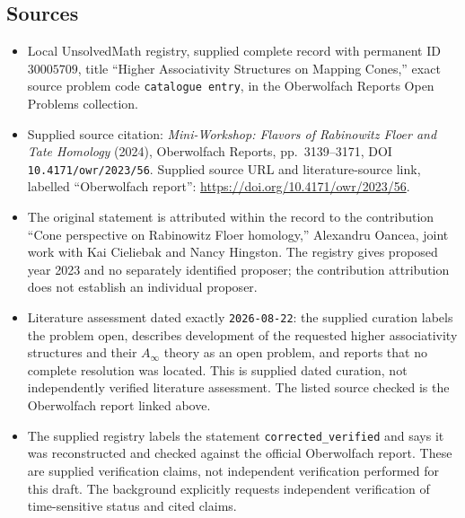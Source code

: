 \documentclass[11pt]{article}
\begin{document}
\subsection{Sources}
\begin{itemize}
\item Local UnsolvedMath registry, supplied complete record with permanent ID \(30005709\), title ``Higher Associativity Structures on Mapping Cones,'' exact source problem code \texttt{catalogue entry}, in the Oberwolfach Reports Open Problems collection.
\item Supplied source citation: \emph{Mini-Workshop: Flavors of Rabinowitz Floer and Tate Homology} (2024), Oberwolfach Reports, pp.~3139--3171, DOI \texttt{10.4171/owr/2023/56}. Supplied source URL and literature-source link, labelled ``Oberwolfach report'': \url{https://doi.org/10.4171/owr/2023/56}.
\item The original statement is attributed within the record to the contribution ``Cone perspective on Rabinowitz Floer homology,'' Alexandru Oancea, joint work with Kai Cieliebak and Nancy Hingston. The registry gives proposed year 2023 and no separately identified proposer; the contribution attribution does not establish an individual proposer.
\item Literature assessment dated exactly \texttt{2026-08-22}: the supplied curation labels the problem open, describes development of the requested higher associativity structures and their \(A_\infty\) theory as an open problem, and reports that no complete resolution was located. This is supplied dated curation, not independently verified literature assessment. The listed source checked is the Oberwolfach report linked above.
\item The supplied registry labels the statement \texttt{corrected\_verified} and says it was reconstructed and checked against the official Oberwolfach report. These are supplied verification claims, not independent verification performed for this draft. The background explicitly requests independent verification of time-sensitive status and cited claims.
\end{itemize}
\end{document}
